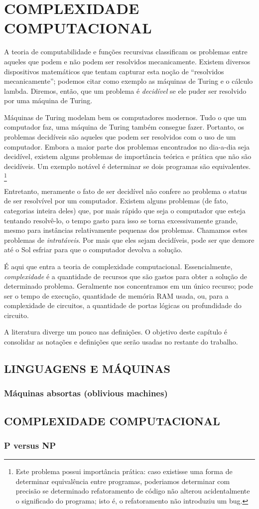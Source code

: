 \chapter{COMPLEXIDADE COMPUTACIONAL}

A teoria de computabilidade e funções recursivas
classificam os problemas entre
aqueles que podem e não podem ser resolvidos mecanicamente.
Existem diversos dispositivos matemáticos
que tentam capturar esta noção de
``resolvidos mecanicamente'';
podemos citar como exemplo
as máquinas de Turing
e o cálculo lambda.
Diremos, então,
que um problema é \emph{decidível}
se ele puder ser resolvido por uma máquina de Turing.

Máquinas de Turing modelam bem os computadores modernos.
Tudo o que um computador faz,
uma máquina de Turing também consegue fazer.
Portanto, os problemas decidíveis são aqueles que
podem ser resolvidos com o uso de um computador.
Embora a maior parte dos problemas
encontrados no dia-a-dia seja decidível,
existem alguns problemas de importância teórica e prática
que não são decidíveis.
Um exemplo notável é determinar se dois programas são equivalentes.
\footnote{
    Este problema possui importância prática:
    caso existisse uma forma de determinar equivalência entre programas,
    poderiamos determinar com precisão
    se determinado refatoramento de código
    não alterou acidentalmente o significado do programa;
    isto é, o refatoramento não introduziu um bug.
}

Entretanto,
meramente o fato de ser decidível
não confere ao problema o status de
ser resolvível por um computador.
Existem alguns problemas
(de fato, categorias inteira deles)
que, por mais rápido que seja o computador
que esteja tentando resolvê-lo,
o tempo gasto para isso
se torna excessivamente grande,
mesmo para instâncias relativamente pequenas dos problemas.
Chamamos estes problemas de \emph{intratáveis}.
Por mais que eles sejam decidíveis,
pode ser que demore até o Sol esfriar
para que o computador devolva a solução.

É aqui que entra a teoria de complexidade computacional.
Essencialmente,
\emph{complexidade}
é a quantidade de recursos que são gastos
para obter a solução de determinado problema.
Geralmente nos concentramos em um único recurso;
pode ser o tempo de execução,
quantidade de memória RAM usada,
ou,
para a complexidade de circuitos,
a quantidade de portas lógicas
ou profundidade do circuito.

A literatura diverge um pouco nas definições.
O objetivo deste capítulo é consolidar
as notações e definições
que serão usadas no restante do trabalho.


\section{LINGUAGENS E MÁQUINAS}

\subsection{Máquinas absortas (oblivious machines)}

\section{COMPLEXIDADE COMPUTACIONAL}

\subsection{P versus NP}
